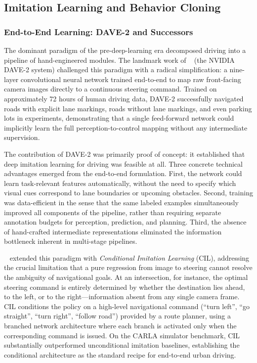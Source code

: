 \documentclass[12pt, a4paper]{article}
\begin{document}
\subsection{Imitation Learning and Behavior Cloning}
\label{sec:imitation}

\subsubsection{End-to-End Learning: DAVE-2 and Successors}

The dominant paradigm of the pre-deep-learning era decomposed driving into a
pipeline of hand-engineered modules.  The landmark work of
\citeauthor{bojarski2016end}~\cite{bojarski2016end} (the NVIDIA DAVE-2 system)
challenged this paradigm with a radical simplification: a nine-layer
convolutional neural network trained end-to-end to map raw front-facing camera
images directly to a continuous steering command.  Trained on approximately
72 hours of human driving data, DAVE-2 successfully navigated roads with
explicit lane markings, roads without lane markings, and even parking lots in
experiments, demonstrating that a single feed-forward network could implicitly
learn the full perception-to-control mapping without any intermediate
supervision.

The contribution of DAVE-2 was primarily proof of concept: it established that
deep imitation learning for driving was feasible at all.  Three concrete
technical advantages emerged from the end-to-end formulation.  First, the
network could learn task-relevant features automatically, without the need to
specify which visual cues correspond to lane boundaries or upcoming obstacles.
Second, training was data-efficient in the sense that the same labeled examples
simultaneously improved all components of the pipeline, rather than requiring
separate annotation budgets for perception, prediction, and planning.  Third,
the absence of hand-crafted intermediate representations eliminated the
information bottleneck inherent in multi-stage pipelines.

\citeauthor{codevilla2018end}~\cite{codevilla2018end} extended this paradigm
with \emph{Conditional Imitation Learning} (CIL), addressing the crucial
limitation that a pure regression from image to steering cannot resolve the
ambiguity of navigational goals.  At an intersection, for instance, the optimal
steering command is entirely determined by whether the destination lies ahead,
to the left, or to the right---information absent from any single camera frame.
CIL conditions the policy on a high-level navigational command (``turn left'',
``go straight'', ``turn right'', ``follow road'') provided by a route planner,
using a branched network architecture where each branch is activated only when
the corresponding command is issued.  On the CARLA simulator benchmark, CIL
substantially outperformed unconditional imitation baselines, establishing the
conditional architecture as the standard recipe for end-to-end urban driving.
\end{document}
